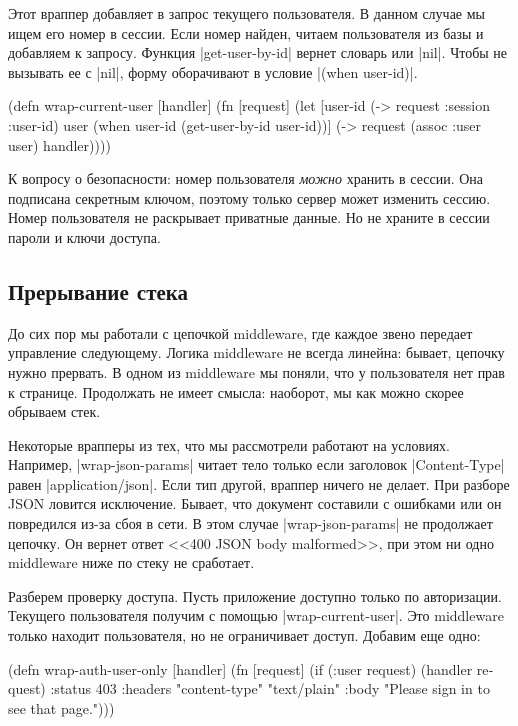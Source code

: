 Этот враппер добавляет в запрос текущего пользователя. В данном случае мы ищем
его номер в сессии. Если номер найден, читаем пользователя из базы и добавляем к
запросу. Функция \spverb|get-user-by-id| вернет словарь или \spverb|nil|. Чтобы
не вызывать ее с \spverb|nil|, форму оборачивают в условие \spverb|(when user-id)|.

\begin{english}
  \begin{clojure}
(defn wrap-current-user [handler]
  (fn [request]
    (let [user-id (-> request :session :user-id)
          user (when user-id
                 (get-user-by-id user-id))]
      (-> request
          (assoc :user user)
          handler))))
  \end{clojure}
\end{english}

К вопросу о безопасности: номер пользователя \emph{можно} хранить в сессии. Она
подписана секретным ключом, поэтому только сервер может изменить сессию. Номер
пользователя не раскрывает приватные данные. Но не храните в сессии пароли и
ключи доступа.

\subsection{Прерывание стека}

До сих пор мы работали с цепочкой middleware, где каждое звено передает
управление следующему. Логика middleware не всегда линейна: бывает, цепочку
нужно прервать. В одном из middleware мы поняли, что у пользователя нет прав к
странице. Продолжать не имеет смысла: наоборот, мы как можно скорее обрываем
стек.

Некоторые врапперы из тех, что мы рассмотрели работают на условиях. Например,
\spverb|wrap-json-params| читает тело только если заголовок
\spverb|Content-Type| равен \spverb|application/json|. Если тип другой, враппер
ничего не делает. При разборе JSON ловится исключение. Бывает, что документ
составили с ошибками или он повредился из-за сбоя в сети. В этом случае
\spverb|wrap-json-params| не продолжает цепочку. Он вернет ответ <<400 JSON body
malformed>>, при этом ни одно middleware ниже по стеку не сработает.

Разберем проверку доступа. Пусть приложение доступно только по
авторизации. Текущего пользователя получим с помощью
\spverb|wrap-current-user|. Это middleware только находит пользователя, но не
ограничивает доступ. Добавим еще одно:

\begin{english}
  \begin{clojure}
(defn wrap-auth-user-only [handler]
  (fn [request]
    (if (:user request)
      (handler request)
      {:status 403
       :headers {"content-type" "text/plain"}
       :body "Please sign in to see that page."})))
  \end{clojure}
\end{english}


